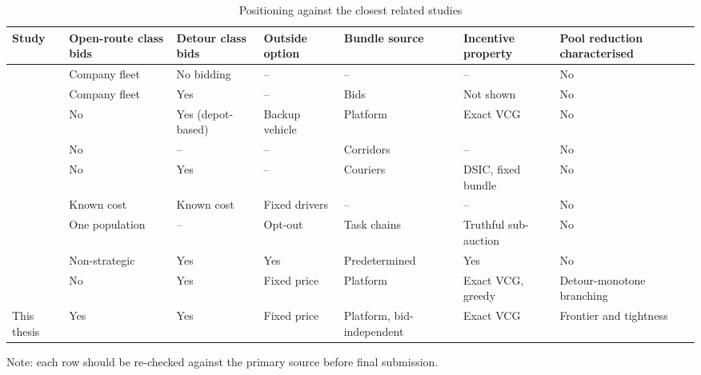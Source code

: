 \begin{table}[t]
\centering
\caption{Positioning against the closest related studies}
\label{tab:positioning}
\footnotesize
\setlength{\tabcolsep}{3pt}
\begin{tabular}{P{2.4cm}P{1.6cm}P{1.7cm}P{1.5cm}P{2.2cm}P{2.0cm}P{2.0cm}}
\toprule
Study & Open-route class bids & Detour class bids & Outside option & Bundle source & Incentive property & Pool reduction characterised \\
\midrule
\citet{archetti2016vrpod} & Company fleet & No bidding & -- & -- & -- & No \\
\citet{triki2021combinatorial} & Company fleet & Yes & -- & Bids & Not shown & No \\
\citet{zou2022mechanisms} & No & Yes (depot-based) & Backup vehicle & Platform & Exact VCG & No \\
\citet{mancini2022bundle} & No & -- & -- & Corridors & -- & No \\
\citet{chen2023truthful} & No & Yes & -- & Couriers & DSIC, fixed bundle & No \\
\citet{luy2024workforce} & Known cost & Known cost & Fixed drivers & -- & -- & No \\
\citet{oyama2025market} & One population & -- & Opt-out & Task chains & Truthful sub-auction & No \\
\citet{xu2026incentive} & Non-strategic & Yes & Yes & Pre\-determined & Yes & No \\
\citet{li2026auction} & No & Yes & Fixed price & Platform & Exact VCG, greedy & Detour-monotone branching \\
This thesis & Yes & Yes & Fixed price & Platform, bid-independent & Exact VCG & Frontier and tightness \\
\bottomrule
\end{tabular}
\par\smallskip\footnotesize Note: each row should be re-checked against the primary source before final submission.
\end{table}

